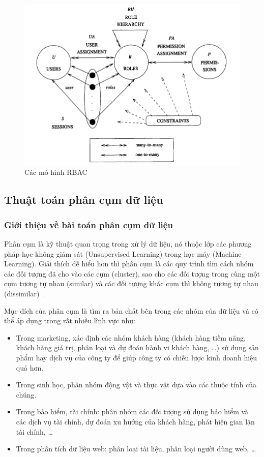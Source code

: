 \begin{figure}[H]
\centering
\includegraphics[width=12cm]{images/RBAC.png}
\caption{Các mô hình RBAC}
\end{figure}

\subsection{Thuật toán phân cụm dữ liệu}
\subsubsection{Giới thiệu về bài toán phân cụm dữ liệu}
Phân cụm là kỹ thuật quan trọng trong xử lý dữ liệu, nó thuộc lớp
các phương pháp học không giám sát (Unsupervised Learning) trong học
máy (Machine Learning). Giải thích dễ hiểu hơn thì phân cụm là
các quy trình tìm cách nhóm các đối tượng đã cho vào các cụm (cluster),
sao cho các đối tượng trong cùng một cụm tương tự nhau (similar) và
các đối tượng khác cụm thì không tương
tự nhau (dissimilar)~\cite{kmeans:online}.

Mục đích của phân cụm là tìm ra bản chất bên trong các
nhóm của dữ liệu và có thể  áp dụng trong rất nhiều lĩnh vực như:
\begin{itemize}[topsep=0ex]
\item Trong marketing, xác định các nhóm khách hàng (khách hàng tiềm
    năng, khách hàng giá trị, phân loại và dự đoán hành vi khách
    hàng, …) sử dụng sản phẩm hay dịch vụ của công ty để giúp
    công ty có chiến lược kinh doanh hiệu quả hơn.

\item Trong sinh học, phân nhóm động vật và thực vật
    dựa vào các thuộc tính của chúng.

\item  Trong bảo hiểm, tài chính: phân nhóm các đối tượng
    sử dụng bảo hiểm và các dịch vụ tài chính, dự đoán xu hướng
    của khách hàng, phát hiện gian lận tài chính, …

\item Trong phân tích dữ liệu web: phân loại tài liệu, phân
    loại người dùng web, …
\end{itemize}

